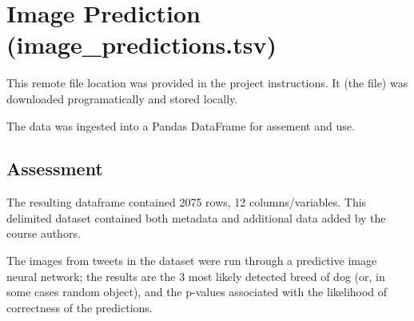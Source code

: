 \documentclass[10pt,a4paper]{report}
\begin{document}
\section{Image Prediction (\textbf{image\_predictions.tsv})}

This remote file location was provided in the project instructions.  It (the file) was downloaded programatically and stored locally. 

The data was ingested into a Pandas DataFrame for assement and use.

	\subsection{Assessment}
	The resulting dataframe contained 2075 rows, 12 columns/variables. This delimited dataset contained both metadata and additional data added by the course authors. 

	The images from tweets in the dataset were run through a predictive image neural network; 
	the results are the 3 most likely detected breed of dog (or, in some cases random object), and the p-values associated with the likelihood of correctness of the predictions.
\end{document}
